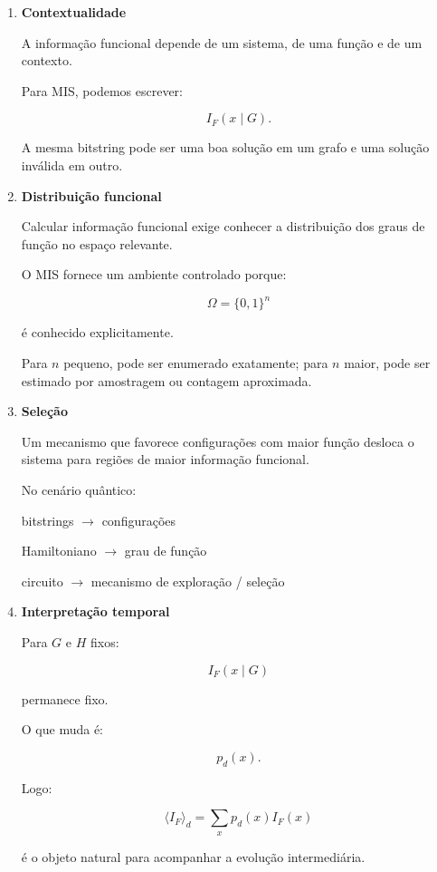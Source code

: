 \documentclass[11pt,a4paper]{article}
\begin{document}
\begin{enumerate}[leftmargin=1.6em]

    \item \textbf{Contextualidade}

    A informação funcional depende de um sistema,
    de uma função e de um contexto.

    Para MIS, podemos escrever:

    \[
    I_F(x\mid G).
    \]

    A mesma bitstring pode ser uma boa solução em um grafo
    e uma solução inválida em outro.

    \item \textbf{Distribuição funcional}

    Calcular informação funcional exige conhecer a distribuição
    dos graus de função no espaço relevante.

    O MIS fornece um ambiente controlado porque:

    \[
    \Omega=\{0,1\}^n
    \]

    é conhecido explicitamente.

    Para $n$ pequeno, pode ser enumerado exatamente;
    para $n$ maior, pode ser estimado por amostragem ou contagem aproximada.

    \item \textbf{Seleção}

    Um mecanismo que favorece configurações com maior função
    desloca o sistema para regiões de maior informação funcional.

    No cenário quântico:

    \begin{center}

    bitstrings
    $\rightarrow$
    configurações

    \medskip

    Hamiltoniano
    $\rightarrow$
    grau de função

    \medskip

    circuito
    $\rightarrow$
    mecanismo de exploração / seleção

    \end{center}

    \item \textbf{Interpretação temporal}

    Para $G$ e $H$ fixos:

    \[
    I_F(x\mid G)
    \]

    permanece fixo.

    O que muda é:

    \[
    p_d(x).
    \]

    Logo:

    \[
    \boxed{
    \langle I_F\rangle_d
    =
    \sum_x p_d(x)I_F(x)
    }
    \]

    é o objeto natural para acompanhar a evolução intermediária.

\end{enumerate}
\end{document}
